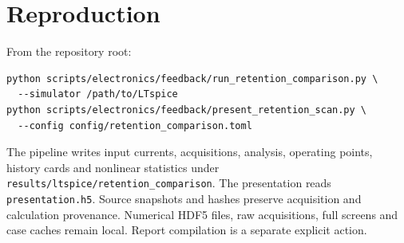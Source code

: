 \documentclass[10pt,a4paper]{article}
\begin{document}
\section{Reproduction}
From the repository root:
\begin{verbatim}
python scripts/electronics/feedback/run_retention_comparison.py \
  --simulator /path/to/LTspice
python scripts/electronics/feedback/present_retention_scan.py \
  --config config/retention_comparison.toml
\end{verbatim}
The pipeline writes input currents, acquisitions, analysis, operating points,
history cards and nonlinear statistics under \texttt{results/ltspice/retention\_comparison}.
The presentation reads \texttt{presentation.h5}. Source snapshots and hashes
preserve acquisition and calculation provenance. Numerical HDF5 files, raw acquisitions, full screens
and case caches remain local. Report compilation is a separate explicit action.
\end{document}
